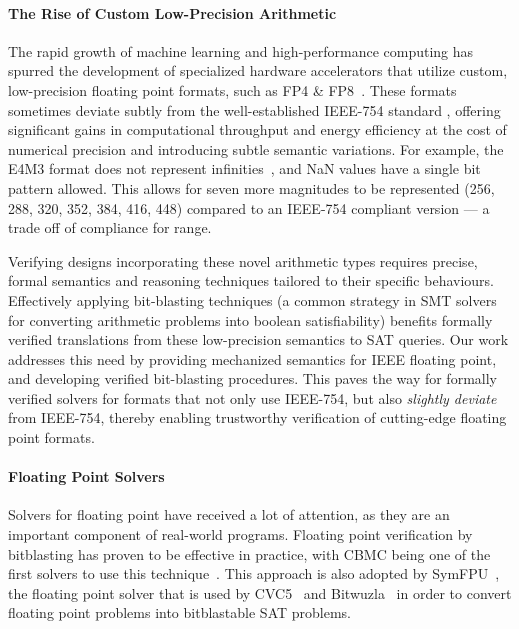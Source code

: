 \documentclass[onecolumn]{article}
\begin{document}
\paragraph{The Rise of Custom Low-Precision Arithmetic}
The rapid growth of machine learning and high-performance
computing has spurred the development of specialized hardware accelerators that
utilize custom, low-precision floating point formats, such as FP4 \& FP8~\cite{micikevicius2022fp8, kim2025investigation}. These formats sometimes
deviate subtly from the well-established IEEE-754 standard \cite{muller2018handbook}, offering significant gains
in computational throughput and energy efficiency at the cost of numerical
precision and introducing subtle semantic variations.
For example, the E4M3 format does not represent infinities~\cite{micikevicius2022fp8},
and NaN values have a single bit pattern allowed.
This allows for seven more magnitudes to be represented (256, 288, 320, 352, 384, 416, 448) compared to an IEEE-754 compliant version ---
a trade off of compliance for range.

Verifying designs incorporating these novel arithmetic types requires
precise, formal semantics and reasoning techniques tailored to their specific behaviours.
Effectively applying bit-blasting techniques (a common strategy in SMT solvers for converting arithmetic problems into boolean satisfiability)
benefits formally verified translations from these low-precision semantics to SAT queries.
Our work addresses this need by providing mechanized semantics for IEEE floating point,
and developing verified bit-blasting procedures.
This paves the way for formally verified solvers for formats that not only use IEEE-754,
but also \emph{slightly deviate} from IEEE-754,
thereby enabling trustworthy verification of cutting-edge floating point formats.

\paragraph{Floating Point Solvers}
Solvers for floating point have received a lot of attention,
as they are an important component of real-world programs.
Floating point verification by bitblasting has proven to be effective in practice,
with CBMC being one of the first solvers to use this technique~\cite{cbmc,brillout2009mixed}.
This approach is also adopted by SymFPU~\cite{symfpu}, the floating point solver that is used by CVC5~\cite{barbosa2022cvc5} and Bitwuzla~\cite{niemetz2023bitwuzla}
in order to convert floating point problems into bitblastable SAT problems.
\end{document}

